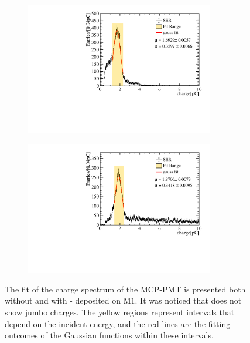 \begin{figure}[htbp]
	\centering
	\begin{subfigure}[b]{0.5\textwidth}
		\centering
		\includegraphics[width=0.9\textwidth]{PMTRelated/GTmodel/fit_noald.pdf}
		\caption{}
		\label{fig:gain_noald}
	\end{subfigure}%
	\hfill
	\begin{subfigure}[b]{0.5\textwidth}
		\centering
		\includegraphics[width=0.9\textwidth]{PMTRelated/GTmodel/fit_ald.pdf}
		\caption{}
		\label{fig:gain_ald}
	\end{subfigure}

	\caption{The fit of the charge spectrum of the MCP-PMT is presented both without  and with  - deposited on $\mathrm{M}1$. It was noticed that  does not show jumbo charges. The yellow regions represent intervals that depend on the incident energy, and the red lines are the fitting outcomes of the Gaussian functions within these intervals.
	}
	\label{fig:gain_fit}
\end{figure}

